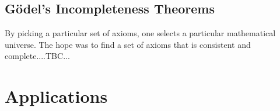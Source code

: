 










\subsection{Gödel's Incompleteness Theorems}
By picking a particular set of axioms, one selects a particular mathematical universe. The hope was to find a set of axioms that is consistent and complete....TBC...






\section{Applications}

